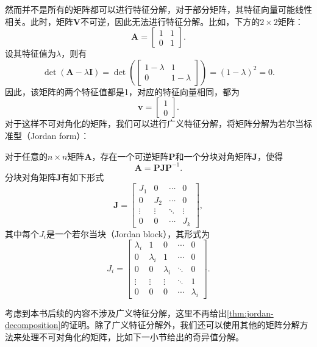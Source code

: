 然而并不是所有的矩阵都可以进行特征分解，对于部分矩阵，其特征向量可能线性相关。此时，矩阵\( \mathbf{V} \)不可逆，因此无法进行特征分解。比如，下方的\( 2 \times 2 \)矩阵：
\[
    \mathbf{A} =
    \begin{bmatrix}
        1 & 1 \\
        0 & 1
    \end{bmatrix}.
\]
设其特征值为\( \lambda \)，则有
\[
    \det(\mathbf{A} - \lambda \mathbf{I}) = \det\left(
    \begin{bmatrix}
            1 - \lambda & 1           \\
            0           & 1 - \lambda
        \end{bmatrix}\right) = (1 - \lambda)^2 = 0.
\]
因此，该矩阵的两个特征值都是1，对应的特征向量相同，都为
\[
    \bm{v} =
    \begin{bmatrix}
        1 \\
        0
    \end{bmatrix}.
\]
对于这样不可对角化的矩阵，我们可以进行广义特征分解，将矩阵分解为若尔当标准型（Jordan form）：
\begin{theorem}[广义特征分解] \label{thm:jordan-decomposition}
    对于任意的\( n \times n \)矩阵\( \mathbf{A} \)，存在一个可逆矩阵\( \mathbf{P} \)和一个分块对角矩阵\( \mathbf{J} \)，使得
    \[
        \mathbf{A} = \mathbf{P} \mathbf{J} \mathbf{P}^{-1}.
    \]
    分块对角矩阵\( \mathbf{J} \)有如下形式
    \[
        \mathbf{J} =
        \begin{bmatrix}
            J_1    & 0      & \cdots & 0      \\
            0      & J_2    & \cdots & 0      \\
            \vdots & \vdots & \ddots & \vdots \\
            0      & 0      & \cdots & J_k
        \end{bmatrix},
    \]
    其中每个\( J_i \)是一个若尔当块（Jordan block），其形式为
    \[
        J_i =
        \begin{bmatrix}
            \lambda_i & 1         & 0         & \cdots & 0         \\
            0         & \lambda_i & 1         & \cdots & 0         \\
            0         & 0         & \lambda_i & \ddots & 0         \\
            \vdots    & \vdots    & \vdots    & \ddots & 1         \\
            0         & 0         & 0         & \cdots & \lambda_i
        \end{bmatrix}.
    \]
\end{theorem}
考虑到本书后续的内容不涉及广义特征分解，这里不再给出\cref{thm:jordan-decomposition}的证明。除了广义特征分解外，我们还可以使用其他的矩阵分解方法来处理不可对角化的矩阵，比如下一小节给出的奇异值分解。

